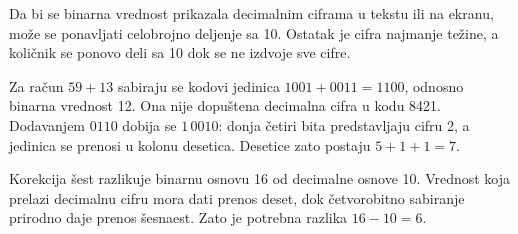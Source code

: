 Da bi se binarna vrednost prikazala decimalnim ciframa u tekstu ili na ekranu, može se ponavljati celobrojno deljenje sa 10. Ostatak je cifra najmanje težine, a količnik se ponovo deli sa 10 dok se ne izdvoje sve cifre.

Za račun $59+13$ sabiraju se kodovi jedinica $1001+0011=1100$, odnosno binarna vrednost 12. Ona nije dopuštena decimalna cifra u kodu 8421. Dodavanjem $0110$ dobija se $1\,0010$: donja četiri bita predstavljaju cifru 2, a jedinica se prenosi u kolonu desetica. Desetice zato postaju $5+1+1=7$.

Korekcija šest razlikuje binarnu osnovu 16 od decimalne osnove 10. Vrednost koja prelazi decimalnu cifru mora dati prenos deset, dok četvorobitno sabiranje prirodno daje prenos šesnaest. Zato je potrebna razlika $16-10=6$.
